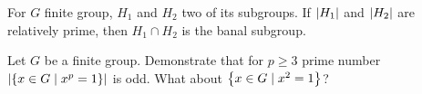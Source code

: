 \begin{exercise}
For \(G\) finite group, \(H_1\) and \(H_2\) two of its subgroups. If \(\left\lvert H_1\right\rvert\) and \(\left\lvert H_2\right\rvert\) are relatively prime, then \(H_1 \cap H_2\) is the banal subgroup.
\end{exercise}

\begin{exercise}
Let \(G\) be a finite group. Demonstrate that for \(p \ge 3\) prime number \( \left\lvert\left\{x \in G \mid x^p = 1\right\}\right\rvert\) is odd. What about \(\left\{x \in G \mid x^2 = 1\right\}\)?
\end{exercise}
